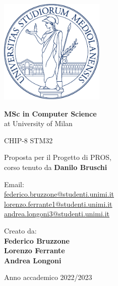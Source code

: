\documentclass[a4paper]{article}
\begin{document}

\begin{titlepage}
	\begin{center}
		\includegraphics[height=5cm]{minerva.pdf}

		\vspace*{1.75cm}

		\LARGE

		\textbf{MSc in Computer Science} \\
		at University of Milan

		\vspace*{1cm}

		\huge
		CHIP-8 STM32

		\large Proposta per il Progetto di PROS, \\
		corso tenuto da \textbf{Danilo Bruschi}

		\normalsize
		\vspace*{4cm}

		\begin{minipage}[t]{0.47\textwidth}
			{Email: } \vspace{0.3em} \\
			{\large \href{federico.bruzzone@studenti.unimi.it}{federico.bruzzone@studenti.unimi.it}} \vspace{1em}  \\
			{\large \href{lorenzo.ferrante1@studenti.unimi.it}{lorenzo.ferrante1@studenti.unimi.it}} \vspace{1em}  \\
			{\large \href{andrea.longoni3@studenti.unimi.it}{andrea.longoni3@studenti.unimi.it}} \vspace{1em}  \\
		\end{minipage}
		\hfill
		\begin{minipage}[t]{0.47\textwidth}\raggedleft
			{Creato da:} \hspace{-0.9em} \vspace{0.3em} \\
			{\large \textbf{Federico Bruzzone}} \\
			\vspace{1em}
			{\large \textbf{Lorenzo Ferrante}} \\
			\vspace{1em}
			{\large \textbf{Andrea Longoni}}
		\end{minipage}

		\vfill
		Anno accademico 2022/2023

	\end{center}
\end{titlepage}
\end{document}
